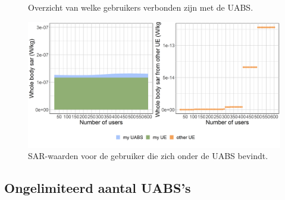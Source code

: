 \documentclass[twocolumn]{phdsymp_dutch}
\begin{document}
\begin{figure}[h]
\hfill
{}
\caption{ Overzicht van welke gebruikers verbonden zijn met de \acs{UABS}.}
  \label{fig:connectionMap}
\end{figure}

\begin{figure}[h]
\centering
  \includegraphics[width=0.9\linewidth]{../results/s2/uvsulsarcentralUser.png}
  \caption{SAR-waarden voor de gebruiker die zich onder de \acs{UABS} bevindt.}
  \label{fig:uvsulsarcentralUsers}
\end{figure}

\subsection{Ongelimiteerd aantal \gls{UABS}'s}
\end{document}
